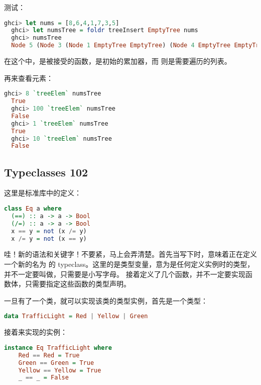 \documentclass[./main.tex]{subfiles}
\begin{document}
测试：

\begin{lstlisting}[language=Haskell]
  ghci> let nums = [8,6,4,1,7,3,5]
  ghci> let numsTree = foldr treeInsert EmptyTree nums
  ghci> numsTree
  Node 5 (Node 3 (Node 1 EmptyTree EmptyTree) (Node 4 EmptyTree EmptyTree)) (Node 7 (Node 6 EmptyTree EmptyTree) (Node 8 EmptyTree EmptyTree))
\end{lstlisting}

在这个中，是被接受的函数，是初始的累加器，而
则是需要遍历的列表。

再来查看元素：

\begin{lstlisting}[language=Haskell]
  ghci> 8 `treeElem` numsTree
  True
  ghci> 100 `treeElem` numsTree
  False
  ghci> 1 `treeElem` numsTree
  True
  ghci> 10 `treeElem` numsTree
  False
\end{lstlisting}

\subsection*{Typeclasses 102}

这里是标准库中的定义：

\begin{lstlisting}[language=Haskell]
  class Eq a where
  (==) :: a -> a -> Bool
  (/=) :: a -> a -> Bool
  x == y = not (x /= y)
  x /= y = not (x == y)
\end{lstlisting}

哇！新的语法和关键字！不要紧，马上会弄清楚。首先当写下时，意味着正在定义一个新的名为
的 typeclass。这里的是类型变量，意为是任何定义实例时的类型，并不一定要叫做，只需要是小写字母。
接着定义了几个函数，并不一定要实现函数体，只需要指定这些函数的类型声明。

一旦有了一个类，就可以实现该类的类型实例，首先是一个类型：

\begin{lstlisting}[language=Haskell]
  data TrafficLight = Red | Yellow | Green
\end{lstlisting}

接着来实现的实例：

\begin{lstlisting}[language=Haskell]
  instance Eq TrafficLight where
    Red == Red = True
    Green == Green = True
    Yellow == Yellow = True
    _ == _ = False
\end{lstlisting}
\end{document}

